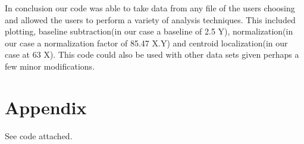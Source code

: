 \documentclass{article}
\begin{document}
In conclusion our code was able to take data from any file of the users choosing and allowed the users to perform a variety of analysis techniques.  This included plotting, baseline subtraction(in our case a baseline of 2.5 Y), normalization(in our case a normalization factor of 85.47 X.Y) and centroid localization(in our case at 63 X).  This code could also be used with other data sets given perhaps a few minor modifications.

\section{Appendix}

See code attached.
\end{document}
